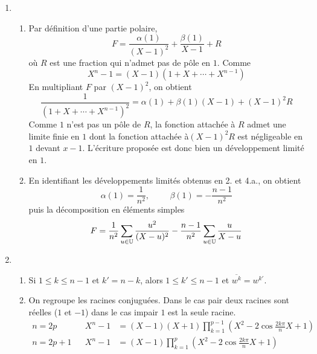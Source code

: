 \begin{enumerate}
 \item
\begin{enumerate}
 \item Par définition d'une partie polaire,
\begin{displaymath}
 F = \frac{\alpha(1)}{(X-1)^2} + \frac{\beta(1)}{X-1} +R
\end{displaymath}
où $R$ est une fraction qui n'admet pas de pôle en $1$. Comme
\begin{displaymath}
 X^n-1 = (X-1)(1+X+\cdots+X^{n-1})
\end{displaymath}
En multipliant $F$ par $(X-1)^2$, on obtient
\begin{displaymath}
 \frac{1}{(1+X+\cdots+X^{n-1})^2} = \alpha(1)+\beta(1)(X-1)+(X-1)^2R
\end{displaymath}
Comme $1$ n'est pas un pôle de $R$, la fonction attachée à $R$ admet une limite finie en $1$ dont la fonction attachée à$(X-1)^2R$ est négligeable en $1$ devant $x-1$. L'écriture proposée est donc bien un développement limité en $1$.
 \item En identifiant les développements limités obtenus en 2. et 4.a., on obtient
\begin{displaymath}
 \alpha(1)=\frac{1}{n^2},\hspace{1cm}\beta(1)=-\frac{n-1}{n^2}
\end{displaymath}
puis la décomposition en éléments simples
\begin{displaymath}
 F= \frac{1}{n^2}\sum_{u\in\mathbb{U}}\frac{u^2}{(X-u)^2} - \frac{n-1}{n^2}\sum_{u\in\mathbb{U}}\frac{u}{X-u}
\end{displaymath}
\end{enumerate}

 \item
\begin{enumerate}
 \item Si $1\leq k \leq n-1$ et $k'=n-k$, alors $1\leq k' \leq n-1$ et $\overline{w^k}=w^{k'}$.
 \item On regroupe les racines conjuguées. Dans le cas pair deux racines sont réelles ($1$ et $-1$) dans le cas impair $1$ est la seule racine.
\begin{align*}
 n=2p& &X^n-1 &= (X-1)(X+1)\prod_{k=1}^{p-1}\left(X^2-2\cos\frac{2k\pi}{n}X +1 \right) \\ 
 n=2p+1& &X^n-1 &= (X-1)\prod_{k=1}^{p}\left(X^2-2\cos\frac{2k\pi}{n}X +1 \right) 
\end{align*}


\end{enumerate}
\end{enumerate}
